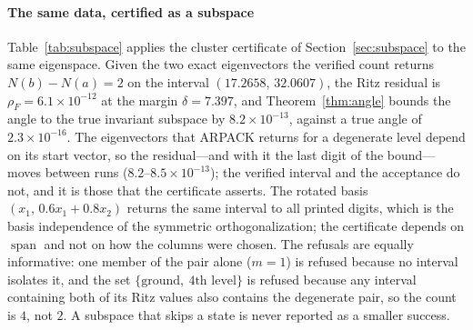 \paragraph{The same data, certified as a subspace}
Table~\ref{tab:subspace} applies the cluster certificate of
Section~\ref{sec:subspace} to the same eigenspace. Given the two exact
eigenvectors the verified count returns $N(b)-N(a)=2$ on the interval
$(17.2658,\,32.0607)$, the Ritz residual is $\rho_F=6.1\times10^{-12}$ at the margin
$\delta=7.397$, and Theorem~\ref{thm:angle} bounds the angle to the
true invariant subspace by $8.2\times10^{-13}$, against a true angle of
$2.3\times10^{-16}$. The eigenvectors that ARPACK returns for a degenerate
level depend on its start vector, so the residual---and with it the last digit
of the bound---moves between runs ($8.2$--$8.5\times10^{-13}$); the verified
interval and the acceptance do not, and it is those that the certificate
asserts. The rotated basis $(x_1,\,0.6x_1+0.8x_2)$ returns the same
interval to all printed digits, which is the basis independence of the
symmetric orthogonalization; the certificate depends on $\operatorname{span}$
and not on how the columns were chosen. The refusals are equally
informative: one member of the pair alone ($m=1$) is refused because no
interval isolates it, and the set $\{\text{ground},\ \text{4th level}\}$ is
refused because any interval containing both of its Ritz values also
contains the degenerate pair, so the count is $4$, not $2$.
A subspace that skips a state is never reported as a smaller success.

\begin{table}[t]
\centering

\caption{Cluster certificates on the $81\times81$ box. $m$ is the number of
vectors supplied, $N(b)-N(a)$ the \emph{verified} multiplicity (a dash when the
certificate refuses before the count is meaningful), $\rho_F$ the Frobenius
residual, $\delta$ the cluster margin \eqref{eq:margin}, $\Theta$ the
certified angle bound $\arcsin(\rho_F/\delta)$ and $\Theta_{\mathrm{true}}$ the
true principal angle, both in radians and the latter computed with a dense
reference. In the neural block,
runs 0, 1 and 2 converged to the same representative and run 3 to its partner;
the certificate accepts the pairs that contain run 3, refuses $(0,1)$ and
$(1,2)$, and accepts $(0,2)$ with a much weaker bound. The last two rows use a
direction forced by deflating the first output.}
\label{tab:subspace}
\end{table}


